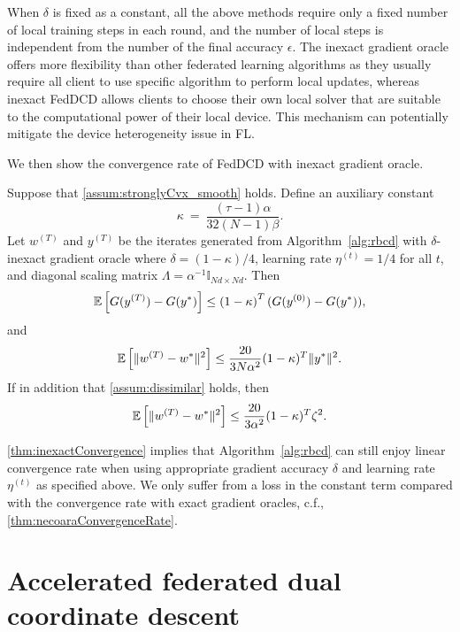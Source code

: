 When $\delta$ is fixed as a constant, all the above methods require only a fixed number of local training steps in each round, and the number of local steps is independent from the number of the final accuracy $\epsilon$. 
The inexact gradient oracle offers more flexibility than other federated learning algorithms as they usually require all client to use specific algorithm to perform local updates, whereas inexact FedDCD allows clients to choose their own local solver that are suitable to the computational power of their local device. This mechanism can potentially mitigate the device heterogeneity issue in FL.

We then show the convergence rate of FedDCD with inexact gradient oracle.
\begin{theorem} \label{thm:inexactConvergence}
    Suppose that \autoref{assum:stronglyCvx_smooth} holds. Define an auxiliary constant
    \[\kappa ~=~ \frac{ (\tau-1) \alpha}{32 (N-1) \beta}.\]
    Let $w^{(T)}$ and $y^{(T)}$ be the iterates generated from Algorithm~\ref{alg:rbcd} with $\delta$-inexact gradient oracle where $\delta=(1-\kappa)/4$, learning rate $\eta^{(t)} = 1/4$ for all $t$, and diagonal scaling matrix $\Lambda = \alpha^{-1} \mathbb{I}_{Nd \times Nd}$. Then
    \begin{equation} \label{eq:InexactDualConvergenceStrongCVX}
        \mathbb{E} \left[ G( y^{(T)} ) - G( y^* ) \right] \leq \left( 1 - \kappa \right)^{T} ( G(y^{(0)}) - G(y^*)  ), 
    \end{equation}
    and
    \begin{equation} \label{eq:InexactPrimalConvergenceStrongCVX}
        \mathbb{E} \left[ \| w^{(T)} - w^* \|^2 \right] \leq \frac{20}{3N\alpha^2}(1-\kappa)^T  \|y^*\|^2. 
    \end{equation}
    If in addition that \autoref{assum:dissimilar} holds, then
    \[\mathbb{E} \left[ \| w^{(T)} - w^* \|^2 \right] \leq \frac{20}{3\alpha^2}(1-\kappa)^T \zeta^2.\]
\end{theorem}

\autoref{thm:inexactConvergence} implies that Algorithm~\ref{alg:rbcd} can still enjoy linear convergence rate when using appropriate gradient accuracy $\delta$ and learning rate $\eta^{(t)}$ as specified above. We only suffer from a loss in the constant term compared with the convergence rate with exact gradient oracles, c.f., \autoref{thm:necoaraConvergenceRate}.

\section{Accelerated federated dual coordinate descent}
\label{sec:accFedDCD}

